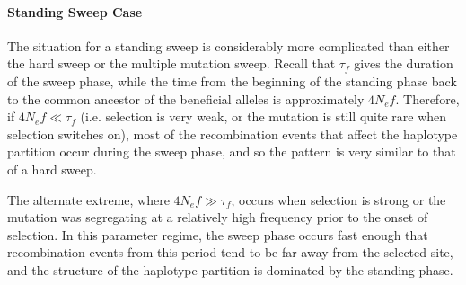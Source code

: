 \documentclass[a4paper,10pt]{article}
\begin{document}
\paragraph{Standing Sweep Case}

The situation for a standing sweep is considerably more complicated than either the hard sweep or the multiple mutation sweep. Recall that $\tau_{f}$ gives the duration of the sweep phase, while the time from the beginning of the standing phase back to the common ancestor of the beneficial alleles is approximately $4N_e f$. Therefore, if $4N_e f \ll \tau_{f}$ (i.e. selection is very weak, or the mutation is still quite rare when selection switches on), most of the recombination events that affect the haplotype partition occur during the sweep phase, and so the pattern is very similar to that of a hard sweep.


The alternate extreme, where $4N_e f \gg \tau_{f}$, occurs when selection is strong or the mutation was segregating at a relatively high frequency prior to the onset of selection. In this parameter regime, the sweep phase occurs fast enough that recombination events from this period tend to be far away from the selected site, and the structure of the haplotype partition is dominated by the standing phase.
\end{document}

